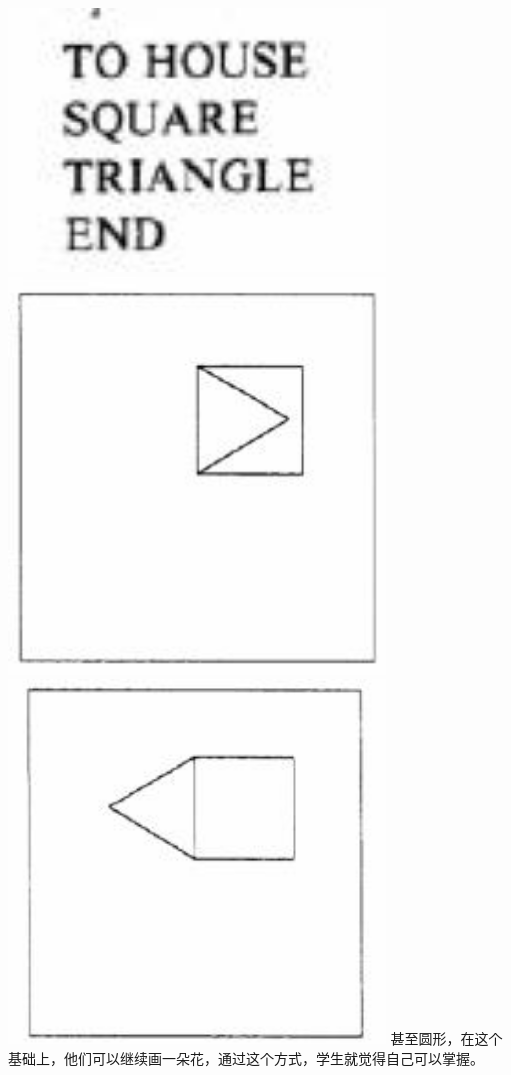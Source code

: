 \includegraphics[width=10cm]{mindstorm_p721.jpg}
\includegraphics[width=10cm]{mindstorm_p722.jpg}
\includegraphics[width=10cm]{mindstorm_p73.jpg}
甚至圆形，在这个基础上，他们可以继续画一朵花，通过这个方式，学生就觉得自己可以掌握。

